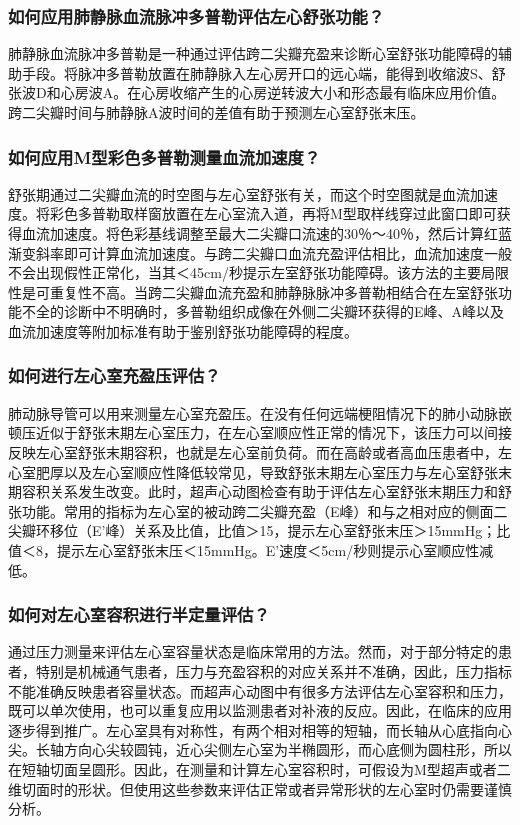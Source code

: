 \subsubsection{如何应用肺静脉血流脉冲多普勒评估左心舒张功能？}

肺静脉血流脉冲多普勒是一种通过评估跨二尖瓣充盈来诊断心室舒张功能障碍的辅助手段。将脉冲多普勒放置在肺静脉入左心房开口的远心端，能得到收缩波S、舒张波D和心房波A。在心房收缩产生的心房逆转波大小和形态最有临床应用价值。跨二尖瓣时间与肺静脉A波时间的差值有助于预测左心室舒张末压。

\subsubsection{如何应用M型彩色多普勒测量血流加速度？}

舒张期通过二尖瓣血流的时空图与左心室舒张有关，而这个时空图就是血流加速度。将彩色多普勒取样窗放置在左心室流入道，再将M型取样线穿过此窗口即可获得血流加速度。将色彩基线调整至最大二尖瓣口流速的30％～40％，然后计算红蓝渐变斜率即可计算血流加速度。与跨二尖瓣口血流充盈评估相比，血流加速度一般不会出现假性正常化，当其＜45cm/秒提示左室舒张功能障碍。该方法的主要局限性是可重复性不高。当跨二尖瓣血流充盈和肺静脉脉冲多普勒相结合在左室舒张功能不全的诊断中不明确时，多普勒组织成像在外侧二尖瓣环获得的E峰、A峰以及血流加速度等附加标准有助于鉴别舒张功能障碍的程度。

\subsubsection{如何进行左心室充盈压评估？}

肺动脉导管可以用来测量左心室充盈压。在没有任何远端梗阻情况下的肺小动脉嵌顿压近似于舒张末期左心室压力，在左心室顺应性正常的情况下，该压力可以间接反映左心室舒张末期容积，也就是左心室前负荷。而在高龄或者高血压患者中，左心室肥厚以及左心室顺应性降低较常见，导致舒张末期左心室压力与左心室舒张末期容积关系发生改变。此时，超声心动图检查有助于评估左心室舒张末期压力和舒张功能。常用的指标为左心室的被动跨二尖瓣充盈（E峰）和与之相对应的侧面二尖瓣环移位（E'峰）关系及比值，比值＞15，提示左心室舒张末压＞15mmHg；比值＜8，提示左心室舒张末压＜15mmHg。E'速度＜5cm/秒则提示心室顺应性减低。

\subsubsection{如何对左心室容积进行半定量评估？}

通过压力测量来评估左心室容量状态是临床常用的方法。然而，对于部分特定的患者，特别是机械通气患者，压力与充盈容积的对应关系并不准确，因此，压力指标不能准确反映患者容量状态。而超声心动图中有很多方法评估左心室容积和压力，既可以单次使用，也可以重复应用以监测患者对补液的反应。因此，在临床的应用逐步得到推广。左心室具有对称性，有两个相对相等的短轴，而长轴从心底指向心尖。长轴方向心尖较圆钝，近心尖侧左心室为半椭圆形，而心底侧为圆柱形，所以在短轴切面呈圆形。因此，在测量和计算左心室容积时，可假设为M型超声或者二维切面时的形状。但使用这些参数来评估正常或者异常形状的左心室时仍需要谨慎分析。

